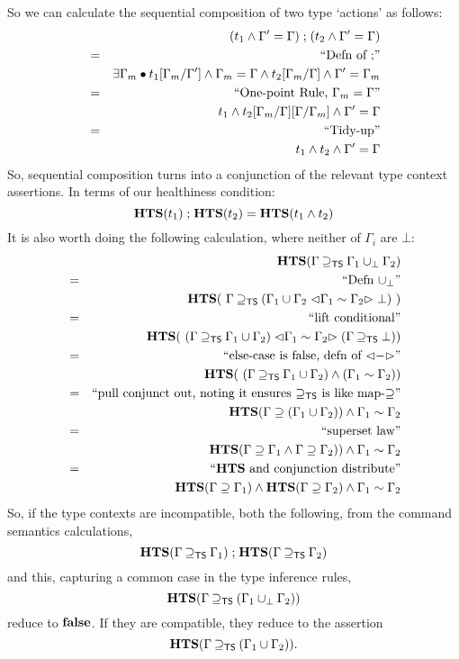 So we can calculate the sequential composition of two type `actions'
as follows:
\begin{eqnarray*}
  && (t_1 \land \Gamma'=\Gamma) \mathrel{;} (t_2 \land \Gamma'=\Gamma)
\\&=&\textrm{``Defn of $\mathrel{;}$''}
\\&& \exists \Gamma_m \bullet
     t_1[\Gamma_m/\Gamma'] \land \Gamma_m=\Gamma
     \land
     t_2[\Gamma_m/\Gamma] \land \Gamma'=\Gamma_m
\\&=&\textrm{``One-point Rule, $\Gamma_m=\Gamma$''}
\\&& t_1
     \land
     t_2[\Gamma_m/\Gamma][\Gamma/\Gamma_m] \land \Gamma'=\Gamma
\\&=&\textrm{``Tidy-up''}
\\&& t_1 \land t_2 \land \Gamma'=\Gamma
\end{eqnarray*}
So, sequential composition turns into a conjunction of the
relevant type context assertions.
In terms of our healthiness condition:
\[
  \mathbf{HTS}(t_1) \mathrel{;} \mathbf{HTS}(t_2)  = \mathbf{HTS}(t_1 \land t_2)
\]
It is also worth doing the following calculation,
where neither of $\Gamma_i$ are $\bot$:
\begin{eqnarray*}
  && \mathbf{HTS}(\Gamma \mathbin{\supseteq_{\mathsf{TS}}} \Gamma_1 \mathbin{\cup_{\bot}} \Gamma_2)
\\&=&\textrm{``Defn $\mathbin{\cup_{\bot}}$''}
\\&& \mathbf{HTS}(~\Gamma \mathbin{\supseteq_{\mathsf{TS}}} ( \Gamma_1 \cup \Gamma_2
                   \mathrel{\lhd{\Gamma_1\sim\Gamma_2}\rhd}
                   \bot)~)
\\&=&\textrm{``lift conditional''}
\\&& \mathbf{HTS}(~(\Gamma \mathbin{\supseteq_{\mathsf{TS}}} \Gamma_1 \cup \Gamma_2)
            \mathrel{\lhd{\Gamma_1\sim\Gamma_2}\rhd}
            (\Gamma \mathbin{\supseteq_{\mathsf{TS}}} \bot))
\\&=&\textrm{``else-case is false, defn of $\mathrel{\lhd{-}\rhd}$''}
\\&& \mathbf{HTS}(~(\Gamma \mathbin{\supseteq_{\mathsf{TS}}} \Gamma_1 \cup \Gamma_2)
            \land (\Gamma_1\sim\Gamma_2))
\\&=&\textrm{``pull conjunct out, noting it ensures $\mathbin{\supseteq_{\mathsf{TS}}}$ is like map-$\supseteq$''}
\\&& \mathbf{HTS}(\Gamma \supseteq ( \Gamma_1 \cup \Gamma_2))
            \land \Gamma_1\sim\Gamma_2
\\&=&\textrm{``superset law''}
\\&& \mathbf{HTS}(\Gamma \supseteq \Gamma_1 \land \Gamma \supseteq \Gamma_2))
            \land \Gamma_1\sim\Gamma_2
\\&=&\textrm{``$\mathbf{HTS}$ and conjunction distribute''}
\\&& \mathbf{HTS}(\Gamma \supseteq \Gamma_1)
     \land \mathbf{HTS}(\Gamma \supseteq \Gamma_2)
            \land \Gamma_1\sim\Gamma_2
\end{eqnarray*}
So, if the type contexts are incompatible,
both the following, from the command semantics calculations,
\[
  \mathbf{HTS}(\Gamma\mathbin{\supseteq_{\mathsf{TS}}}\Gamma_1) \mathrel{;} \mathbf{HTS}(\Gamma\mathbin{\supseteq_{\mathsf{TS}}}\Gamma_2)
\]
and this, capturing a common case in the type inference rules,
\[
  \mathbf{HTS}(\Gamma\mathbin{\supseteq_{\mathsf{TS}}}(\Gamma_1\mathbin{\cup_{\bot}}\Gamma_2))
\]
reduce to $\mathbf{false}$.
If they are compatible, they reduce to the assertion
\[
  \mathbf{HTS}(\Gamma\mathbin{\supseteq_{\mathsf{TS}}}(\Gamma_1\cup\Gamma_2)).
\]
